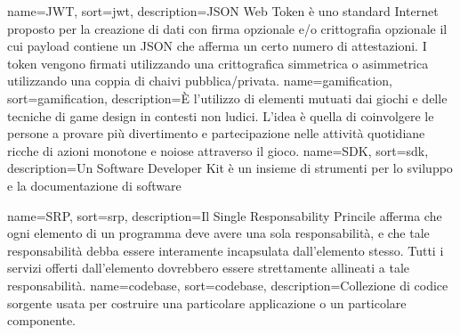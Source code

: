 {
    name=JWT,
    sort=jwt,
    description={JSON Web Token è uno standard Internet proposto per la creazione di dati con firma opzionale e/o crittografia opzionale il cui payload contiene un JSON che afferma un certo numero di attestazioni. I token vengono firmati utilizzando una crittografica simmetrica o asimmetrica utilizzando una coppia di chaivi pubblica/privata.}
}
{
    name=gamification,
    sort=gamification,
    description={È l'utilizzo di elementi mutuati dai giochi e delle tecniche di game design in contesti non ludici. L'idea è quella di coinvolgere le persone a provare più divertimento e partecipazione nelle attività quotidiane ricche di azioni monotone e noiose attraverso il gioco.}
}
{
    name=SDK,
    sort=sdk,
    description={Un Software Developer Kit è un insieme di strumenti per lo sviluppo e la documentazione di software}
}

{
    name=SRP,
    sort=srp,
    description={Il Single Responsability Princile afferma che ogni elemento di un programma deve avere una sola responsabilità, e che tale responsabilità debba essere interamente incapsulata dall'elemento stesso. Tutti i servizi offerti dall'elemento dovrebbero essere strettamente allineati a tale responsabilità. }
}
{
    name=codebase,
    sort=codebase,
    description={Collezione di codice sorgente usata per costruire una particolare applicazione o un particolare componente.}
}